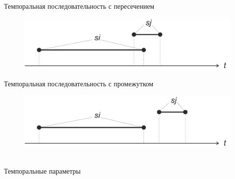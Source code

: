 \begin{frame}{Темпоральная последовательность с пересечением}
	\topline
	\justifying
	\vspace{10mm}
	\begin{SCn}
		\begin{figure}[H]
			\includegraphics[scale=0.6]{./figures/sd_temp_entities/img_temporal_cross_sequence.png}
		\end{figure}
	\end{SCn}
\end{frame}

\begin{frame}{Темпоральная последовательность с промежутком}
	\topline
	\justifying
	\vspace{10mm}
	\begin{SCn}
		\begin{figure}[H]
			\includegraphics[scale=0.6]{./figures/sd_temp_entities/img_temporal_sequence_with_intermediate.png}
		\end{figure}
	\end{SCn}
\end{frame}

\begin{frame}{\\Темпоральные параметры}
	\topline
	\justifying
\end{frame}

